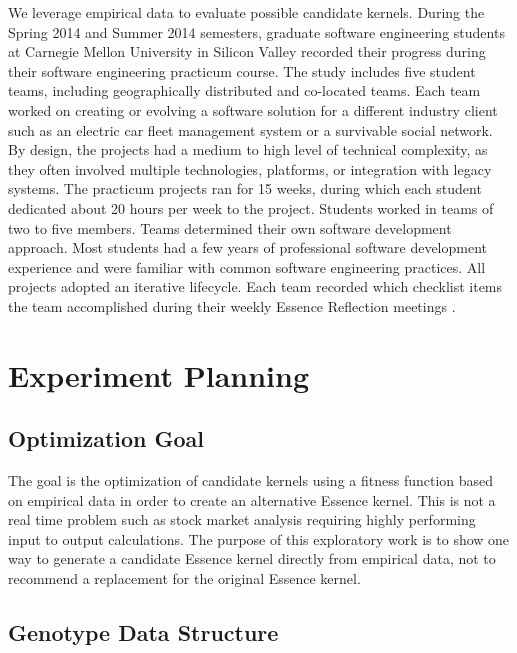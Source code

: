 \documentclass[3p,times,procedia]{elsarticle}
\begin{document}
We leverage empirical data to evaluate possible candidate kernels. During the Spring 2014 and Summer 2014 semesters, graduate software engineering students at Carnegie Mellon University in Silicon Valley recorded their progress during their software engineering practicum course. The study includes five student teams, including geographically distributed and co-located
teams. Each team worked on creating or evolving a software solution for a different industry client such as an electric car fleet management system or a survivable social network. By design, the projects had a medium to high level of technical complexity, as they often involved multiple technologies, platforms, or integration with legacy systems. The practicum
projects ran for 15 weeks, during which each student dedicated about 20 hours per week to the project. Students worked in teams of two to five members. Teams determined their own software development approach. Most students had a few years of professional software development experience and were familiar with common software engineering practices. All projects adopted an iterative lifecycle. Each team recorded which checklist items the team accomplished during their weekly Essence Reflection meetings \cite{EASE2014}.


\section{Experiment Planning}
\subsection{Optimization Goal}
\label{Optimization Application}
The goal is the optimization of candidate kernels using a fitness function based on empirical data in order to create an alternative Essence kernel. This is not a real time problem such as stock market analysis requiring highly performing input to output calculations. The purpose of this exploratory work is to show one way to generate a candidate Essence kernel directly from empirical data, not to recommend a replacement for the original Essence kernel.


\subsection{Genotype Data Structure}
\end{document}
